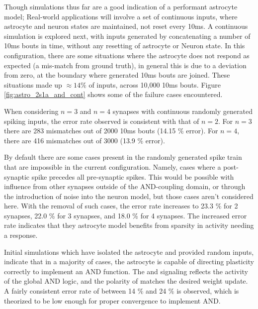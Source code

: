 Though simulations thus far are a good indication of a performant astrocyte
model; Real-world applications will involve a set of continuous inputs, where
astrocyte and neuron states are maintained, not reset every 10ms. A continuous
simulation is explored next, with inputs generated by concatenating a number of
10ms bouts in time, without any resetting of astrocyte or Neuron state. In this
configuration, there are some situations where the astrocyte does not respond as
expected (a mis-match from ground truth), in general this is due to a \ca
deviation from zero, at the boundary where generated 10ms bouts are
joined. These situations made up $\approx 14\%$ of inputs, across 10,000 10ms
bouts. Figure \ref{fig:astro_2s1a_and_cont} shows some of the failure cases
encountered.


When considering $n=3$ and $n=4$ synapses with continuous randomly generated
spiking inputs, the error rate observed is consistent with that of $n=2$. For
$n=3$ there are 283 mismatches out of 2000 10ms bouts (14.15 \% error). For
$n=4$, there are 416 mismatches out of 3000 (13.9 \% error).

By default there are some cases present in the randomly generated spike train
that are impossible in the current configuration. Namely, cases where a
post-synaptic spike precedes all pre-synaptic spikes. This would be possible
with influence from other synapses outside of the AND-coupling domain, or
through the introduction of noise into the neuron model, but those cases aren't
considered here. With the removal of such cases, the error rate increases to
23.3 \% for 2 synapses, 22.0 \% for 3 synapses, and 18.0 \% for 4 synapses. The
increased error rate indicates that they astrocyte model benefits from sparsity
in activity needing a response.

Initial simulations which have isolated the astrocyte and provided random
inputs, indicate that in a majority of cases, the astrocyte is capable of
directing plasticity correctly to implement an AND function. The
\dser and \serca signaling reflects the activity of the global AND logic, and
the polarity of \dser matches the desired weight update. A fairly consistent
error rate of between 14 \% and 24 \% is observed, which is theorized to be low
enough for proper convergence to implement AND.

